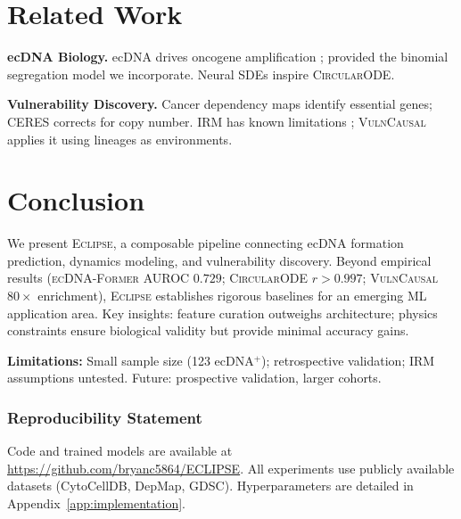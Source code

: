 \documentclass{article}
\newcommand{\eclipse}{\textsc{Eclipse}}
\newcommand{\former}{\textsc{ecDNA-Former}}
\newcommand{\circularode}{\textsc{CircularODE}}
\newcommand{\vulncausal}{\textsc{VulnCausal}}
\begin{document}
\section{Related Work}
\label{sec:related}

\textbf{ecDNA Biology.} ecDNA drives oncogene amplification \citep{turner_2017_ecdna, verhaak_2019_ecdna_review}; \citet{lange_2022_mathematical} provided the binomial segregation model we incorporate. Neural SDEs \citep{li_2020_neuralsde} inspire \circularode{}.

\textbf{Vulnerability Discovery.} Cancer dependency maps \citep{tsherniak_2017_depmap, behan_2019_prioritization} identify essential genes; CERES \citep{meyers_2017_ceres} corrects for copy number. IRM \citep{arjovsky_2019_irm} has known limitations \citep{rosenfeld_2021_irm_risks}; \vulncausal{} applies it using lineages as environments.


\section{Conclusion}
\label{sec:conclusion}

We present \eclipse{}, a composable pipeline connecting ecDNA formation prediction, dynamics modeling, and vulnerability discovery. Beyond empirical results (\former{} AUROC $0.729$; \circularode{} $r > 0.997$; \vulncausal{} $80\times$ enrichment), \eclipse{} establishes rigorous baselines for an emerging ML application area. Key insights: feature curation outweighs architecture; physics constraints ensure biological validity but provide minimal accuracy gains.

\textbf{Limitations:} Small sample size (123 ecDNA$^+$); retrospective validation; IRM assumptions untested. Future: prospective validation, larger cohorts.


\subsubsection*{Reproducibility Statement}
Code and trained models are available at \url{https://github.com/bryanc5864/ECLIPSE}. All experiments use publicly available datasets (CytoCellDB, DepMap, GDSC). Hyperparameters are detailed in Appendix~\ref{app:implementation}.
\end{document}
